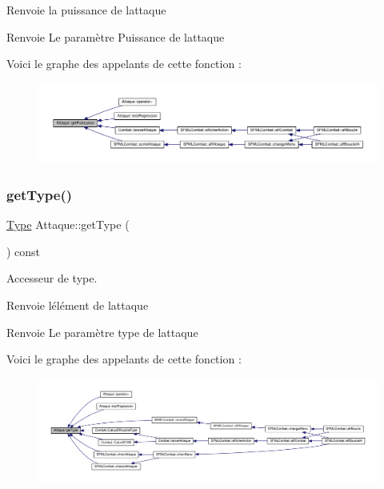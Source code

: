 Renvoie la puissance de l\textquotesingle{}attaque \begin{DoxyReturn}{Renvoie}
Le paramètre Puissance de l\textquotesingle{}attaque 
\end{DoxyReturn}
Voici le graphe des appelants de cette fonction \+:\nopagebreak
\begin{figure}[H]
\begin{center}
\leavevmode
\includegraphics[width=350pt]{class_attaque_a92ae062d505e82c80621069dc6a917d1_icgraph}
\end{center}
\end{figure}
\mbox{\label{class_attaque_af43d72ec9abad98f04e21e245cece692}} 
\subsubsection{\texorpdfstring{get\+Type()}{getType()}}
{\footnotesize\ttfamily \hyperlink{_attaque_8h_a1d1cfd8ffb84e947f82999c682b666a7}{Type} Attaque\+::get\+Type (\begin{DoxyParamCaption}{ }\end{DoxyParamCaption}) const}



Accesseur de type. 

Renvoie l\textquotesingle{}élément de l\textquotesingle{}attaque \begin{DoxyReturn}{Renvoie}
Le paramètre type de l\textquotesingle{}attaque 
\end{DoxyReturn}
Voici le graphe des appelants de cette fonction \+:\nopagebreak
\begin{figure}[H]
\begin{center}
\leavevmode
\includegraphics[width=350pt]{class_attaque_af43d72ec9abad98f04e21e245cece692_icgraph}
\end{center}
\end{figure}
\mbox{\label{class_attaque_acb25c596d5b90b2330d3188749bc130d}} 
